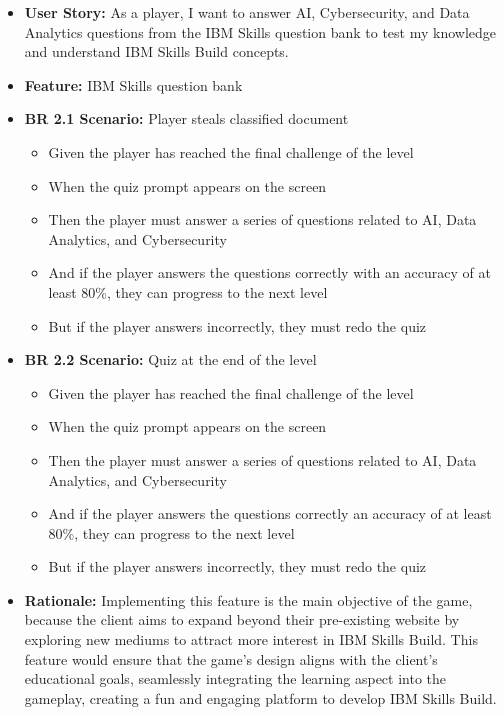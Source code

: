\documentclass[11pt, a4paper]{article}
\begin{document}
\begin{itemize}
    \item \textbf{User Story:} As a player, I want to answer AI, Cybersecurity, and Data Analytics questions from the IBM Skills question bank to test my knowledge and understand IBM Skills Build concepts.

    \item \textbf{Feature:} IBM Skills question bank

    \item \textbf{BR 2.1 Scenario:} Player steals classified document

          \begin{itemize}
              \item Given the player has reached the final challenge of the level
              \item When the quiz prompt appears on the screen
              \item Then the player must answer a series of questions related to AI, Data Analytics, and Cybersecurity
              \item And if the player answers the questions correctly with an
                    accuracy of at least 80\%, they can progress to the next level
              \item But if the player answers incorrectly, they must redo the quiz
          \end{itemize}

    \item \textbf{BR 2.2 Scenario:} Quiz at the end of the level

          \begin{itemize}
              \item Given the player has reached the final challenge of the level
              \item When the quiz prompt appears on the screen
              \item Then the player must answer a series of questions related to AI, Data Analytics, and Cybersecurity
              \item And if the player answers the questions correctly an accuracy of at least 80\%, they can progress to the next level
              \item But if the player answers incorrectly, they must redo the quiz
          \end{itemize}

    \item \textbf{Rationale:} Implementing this feature is the main objective of the game, because the client aims to expand beyond their pre-existing website by exploring new mediums to attract more interest in IBM Skills Build. This feature would ensure that the game’s design aligns with the client’s educational goals, seamlessly integrating the learning aspect into the gameplay, creating a fun and engaging platform to develop IBM Skills Build.


\end{itemize}
\end{document}
